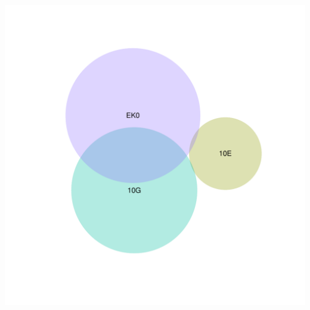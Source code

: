 \documentclass{article}\usepackage[]{graphicx}\usepackage[]{color}
\newenvironment{knitrout}{}{} %
\begin{document}
\begin{knitrout}
\color{fgcolor}

{\centering \includegraphics[width=1\linewidth,height=.4\textheight]{figure/minimal-venn_t3_3fc_down_euler-1} 

}



\end{knitrout}
\clearpage



\end{document}
